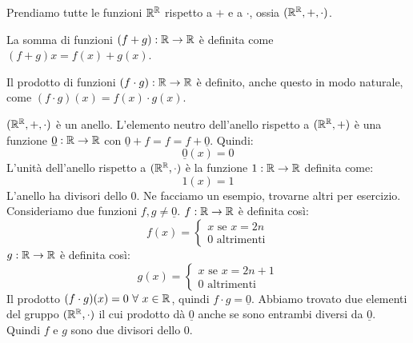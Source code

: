 \begin{exmp}
Prendiamo tutte le funzioni $\mathbb{R}^{\mathbb{R}}$ rispetto a $+$ e a $\cdot$, ossia $(\mathbb{R}^{\mathbb{R}}, +, \cdot)$.

La somma di funzioni $(f + g) : \mathbb{R} \to \mathbb{R}$ \`e definita come $(f + g) x = f(x) + g(x) $.

Il prodotto di funzioni $(f \cdot g) : \mathbb{R} \to \mathbb{R}$ \`e definito, anche questo in modo naturale, come $(f \cdot g) (x) = f(x) \cdot g(x)$.

$(\mathbb{R}^{\mathbb{R}}, +, \cdot)$ \`e un anello. L'elemento neutro dell'anello rispetto a $(\mathbb{R}^{\mathbb{R}}, +)$ \`e una funzione $\underline{0} : \mathbb{R} \to \mathbb{R}$ con $\underline{0} + f = f = f + \underline{0}$. Quindi:
\[
\underline{0} (x) = 0
\]
L'unit\`a dell'anello rispetto a $(\mathbb{R}^{\mathbb{R}}, \cdot)$ \`e la funzione $1 : \mathbb{R} \to \mathbb{R}$ definita come:
\[
1(x) = 1
\]
L'anello ha divisori dello 0. Ne facciamo un esempio, trovarne altri per esercizio. Consideriamo due funzioni $f, g \neq \underline{0}$. $f : \mathbb{R} \to \mathbb{R}$ \`e definita cos\`i:
\[
f(x) =
\begin{cases}
x \text{ se } x = 2n \\
0 \text{ altrimenti}
\end{cases}
\]
$g : \mathbb{R} \to \mathbb{R}$ \`e definita cos\`i:
\[
g(x) =
\begin{cases}
x \text{ se } x = 2n + 1 \\
0 \text{ altrimenti}
\end{cases}
\]
Il prodotto $(f \cdot g) (x) = 0 \forall x \in \reals$, quindi $f \cdot g = \underline{0}$. Abbiamo trovato due elementi del gruppo $(\mathbb{R}^{\mathbb{R}}, \cdot)$ il cui prodotto d\`a $\underline{0}$ anche se sono entrambi diversi da $\underline{0}$. Quindi $f$ e $g$ sono due divisori dello 0.
\end{exmp}

